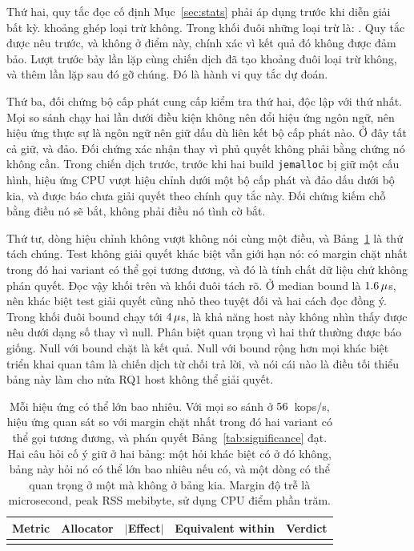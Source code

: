 Thứ hai, quy tắc đọc cố định Mục~\ref{sec:stats} phải áp dụng trước khi diễn giải bất kỳ. \NExclZero{} khoảng ghép loại trừ không. Trong khối đuôi những loại trừ là: \TailExclZeroRows. Quy tắc được nêu trước, và không ở điểm này, chính xác
vì kết quả đó không được đảm bảo. Lượt trước bảy lần lặp cùng chiến dịch
đã tạo khoảng đuôi loại trừ không, và thêm lần lặp sau đó gỡ chúng. Đó là hành vi
quy tắc dự đoán.

Thứ ba, đối chứng bộ cấp phát cung cấp kiểm tra thứ hai, độc lập với thứ nhất. Mọi so sánh
chạy hai lần dưới điều kiện không nên đổi hiệu ứng ngôn ngữ, nên hiệu ứng thực sự
là ngôn ngữ nên giữ dấu dù liên kết bộ cấp phát nào. Ở đây
\CrossAllocConsistent{} tất cả giữ, và \NCrossAllocReversed{} đảo. Đối chứng xác nhận thay vì
phủ quyết không phải bằng chứng nó không cần. Trong chiến dịch trước, trước khi hai build \texttt{jemalloc} bị giữ một cấu hình, hiệu ứng CPU vượt hiệu chỉnh
dưới một bộ cấp phát và đảo dấu dưới bộ kia, và được báo chưa giải quyết theo
chính quy tắc này. Đối chứng kiếm chỗ bằng điều nó sẽ bắt, không phải điều nó
tình cờ bắt.

Thứ tư, \NEqvUnresolved{} dòng hiệu chỉnh không vượt không nói cùng một điều, và Bảng~\ref{tab:equivalence} là thứ tách chúng. Test không giải quyết khác biệt vẫn giới hạn nó: có margin chặt nhất trong đó hai variant có thể
gọi tương đương, và đó là tính chất dữ liệu chứ không phán quyết. Đọc vậy
khối trên và khối đuôi tách rõ. Ở median bound là
$1.6\,\mu$s, nên khác biệt test giải quyết cũng nhỏ theo tuyệt đối
và hai cách đọc đồng ý. Trong khối đuôi bound chạy tới $4\,\mu$s,
là khả năng host này không nhìn thấy được nêu dưới dạng số thay vì null. Phân biệt
quan trọng vì hai thứ thường được báo giống. Null với bound chặt là
kết quả. Null với bound rộng hơn mọi khác biệt triển khai quan tâm là
chiến dịch từ chối trả lời, và nói cái nào là điều tối thiểu bảng này làm cho nửa RQ1 host không thể giải quyết.

\begin{table}[H]
\centering
\small
\caption[Mỗi hiệu ứng có thể lớn bao nhiêu, cho so sánh test không giải quyết]{Mỗi hiệu ứng có thể lớn bao nhiêu. Với mọi so sánh ở $56$~kops/s,
hiệu ứng quan sát so với margin chặt nhất trong đó hai variant có thể gọi
tương đương, và phán quyết Bảng~\ref{tab:significance} đạt. Hai câu hỏi
cố ý giữ ở hai bảng: một hỏi khác biệt có ở đó không, bảng này hỏi nó
có thể lớn bao nhiêu nếu có, và một dòng có thể quan trọng ở một mà không ở bảng kia. Margin độ trễ là
microsecond, peak RSS mebibyte, sử dụng CPU điểm phần
trăm.\label{tab:equivalence}}
\begin{tabular}{@{}l l r r l@{}}
\hline\hline
Metric & Allocator & $|$Effect$|$ & Equivalent within & Verdict \\
\hline
\\
\hline
\end{tabular}
\end{table}


